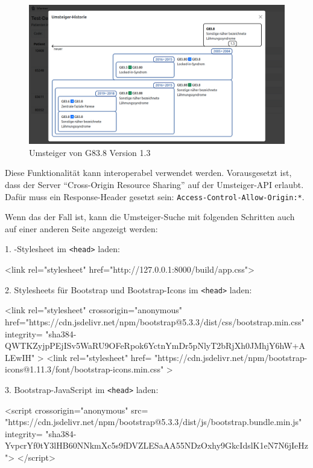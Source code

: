 \begin{figure}[H]
    \centering
    \includegraphics[width=\linewidth]{../img/umsteiger_screenshot.png}
    \vspace{-1em}\caption{Umsteiger von G83.8 Version 1.3}
    \label{hori-umst}
\end{figure}

Diese Funktionalität kann interoperabel verwendet werden. Vorausgesetzt ist, dass der Server "`Cross-Origin Resource Sharing"' auf der Umsteiger-API erlaubt. Dafür muss ein Response-Header gesetzt sein: \texttt{Access-Control-Allow-Origin:*}.

Wenn das der Fall ist, kann die Umsteiger-Suche mit folgenden Schritten auch auf einer anderen Seite angezeigt werden:

1. \bfarmer-Stylesheet im \texttt{<head>} laden:
\begin{Code}
<link rel="stylesheet" href="http://127.0.0.1:8000/build/app.css">
\end{Code}

2. Stylesheets für Bootstrap und Bootstrap-Icons im \texttt{<head>} laden:
\begin{Code}
<link
  rel="stylesheet" crossorigin="anonymous"
  href="https://cdn.jsdelivr.net/npm/bootstrap@5.3.3/dist/css/bootstrap.min.css"  
  integrity=
"sha384-QWTKZyjpPEjISv5WaRU9OFeRpok6YctnYmDr5pNlyT2bRjXh0JMhjY6hW+ALEwIH"
>
<link
  rel="stylesheet" href=
"https://cdn.jsdelivr.net/npm/bootstrap-icons@1.11.3/font/bootstrap-icons.min.css"
>
\end{Code}

\newpage

3. Bootstrap-JavaScript im \texttt{<head>} laden:
\begin{Code}
<script crossorigin="anonymous"
  src=
"https://cdn.jsdelivr.net/npm/bootstrap@5.3.3/dist/js/bootstrap.bundle.min.js"
  integrity=
"sha384-YvpcrYf0tY3lHB60NNkmXc5s9fDVZLESaAA55NDzOxhy9GkcIdslK1eN7N6jIeHz">
</script>
\end{Code}

